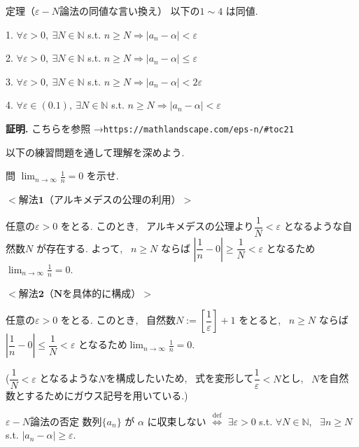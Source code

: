 \documentclass[10pt]{jsarticle}
\begin{document}
\begin{itembox}[l]{定理（$\varepsilon-N$論法の同値な言い換え）}
  以下の$1 \sim 4$ は同値.

  1. $\forall \varepsilon > 0, \ \exists N \in \mathbb{N}$ s.t.
  $n \ge N \Longrightarrow |a_n - \alpha| < \varepsilon$

  2. $\forall \varepsilon > 0, \ \exists N \in \mathbb{N}$ s.t.
  $n \ge N \Longrightarrow |a_n - \alpha| \le \varepsilon$

  3. $\forall \varepsilon > 0, \ \exists N \in \mathbb{N}$ s.t.
  $n \ge N \Longrightarrow |a_n - \alpha| < 2\varepsilon$

  4. $\forall \varepsilon \in (0. 1), \ \exists N \in \mathbb{N}$ s.t.
  $n \ge N \Longrightarrow |a_n - \alpha| < \varepsilon$
\end{itembox}

\textbf{証明.}
こちらを参照  →\verb|https://mathlandscape.com/eps-n/#toc21|

\bigskip
\bigskip

以下の練習問題を通して理解を深めよう.

\begin{itembox}[l]{問}
  $\displaystyle \lim_{n \to \infty} \frac{1}{n} = 0$ を示せ.
\end{itembox}

\bigskip

$< \textbf{解法1（アルキメデスの公理の利用）}>$

任意の$\varepsilon > 0$ をとる. このとき, \ アルキメデスの公理より$\dfrac{1}{N} < \varepsilon$ となるような自然数$N$ が存在する. よって, \ $n \ge N$ ならば $\left|\dfrac{1}{n} - 0 \right| \ge \dfrac{1}{N} < \varepsilon$ となるため$\displaystyle \lim_{n \to \infty} \frac{1}{n} = 0$.

\bigskip
\bigskip

$< \textbf{解法2（Nを具体的に構成）}>$

任意の$\varepsilon > 0$ をとる. このとき, \ 自然数$N := \left[\dfrac{1}{\varepsilon} \right] + 1$ をとると, \ $n \ge N$ ならば $\left|\dfrac{1}{n} - 0 \right| \le \dfrac{1}{N} < \varepsilon$ となるため$\displaystyle \lim_{n \to \infty} \frac{1}{n} = 0$.

($\dfrac{1}{N} < \varepsilon$ となるような$N$を構成したいため, \ 式を変形して$\dfrac{1}{\varepsilon} < N$とし, \ $N$を自然数とするためにガウス記号を用いている.)

\bigskip
\bigskip

\begin{itembox}[l]{$\varepsilon-N$論法の否定}
  数列$\{a_n\}$ が $\alpha$ に収束しない
  $\overset{\mathrm{def}}{\iff}$
  $\exists \varepsilon > 0$ s.t. $\forall N \in \mathbb{N}$, \ 
  $\exists n \ge N$ s.t. $|a_n - \alpha| \ge \varepsilon$.
\end{itembox}
\end{document}
